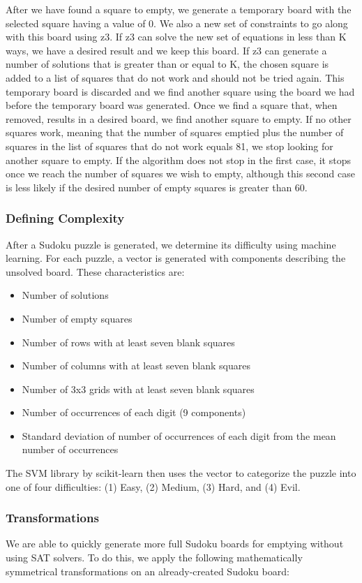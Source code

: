 After we have found a square to empty, we generate a temporary board
with the selected square  having a value of 0. We also a new set of
constraints to go along with this board using z3. If z3 can solve the
new set of equations in less than K ways, we have a desired result and
we keep this board. If z3 can generate a number of solutions that is
greater than or equal to K, the chosen square is added to a list of
squares that do not work and should not be tried again. This temporary
board is discarded and we find another square using the board we had
before the temporary board was generated. Once we find a square that,
when removed, results in a desired board, we find another square to
empty. If no other squares work, meaning that the number of squares
emptied plus the number of squares in the list of squares that do not
work equals 81, we stop looking for another square to empty. If the
algorithm does not stop in the first case, it stops once we reach the
number of squares we wish to empty, although this second case is less
likely if the desired number of empty squares is greater than 60.

\subsubsection{Defining Complexity}
After a Sudoku puzzle is generated, we determine its difficulty using
machine learning. For each puzzle, a vector is generated with
components describing the unsolved board. These characteristics are:

\begin{itemize}
\item Number of solutions
\item Number of empty squares
\item Number of rows with at least seven blank squares
\item Number of columns with at least seven blank squares
\item Number of 3x3 grids with at least seven blank squares
\item Number of occurrences of each digit (9 components)
\item Standard deviation of number of occurrences of each digit from the mean number of occurrences
\end{itemize}


The SVM library by scikit-learn then uses the vector to categorize the
puzzle into one of four difficulties: (1) Easy, (2) Medium, (3) Hard,
and (4) Evil.

\subsubsection{Transformations}
We are able to quickly generate more full Sudoku boards for emptying
without using SAT solvers. To do this, we apply the following
mathematically symmetrical transformations on an already-created
Sudoku board:


